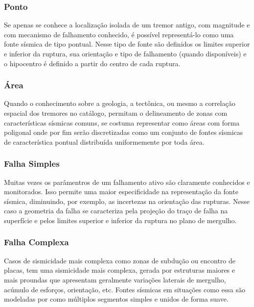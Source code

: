\subsubsection{Ponto}
\label{sec:point_source}

Se apenas se conhece a localização isolada de um tremor antigo, com magnitude e com mecanismo de falhamento conhecido,
é possível representá-lo como uma fonte sísmica de tipo pontual. Nesse tipo de fonte são definidos os limites superior e
inferior da ruptura, sua orientação e tipo de falhamento (quando disponíveis) e o hipocentro é definido a partir do
centro de cada ruptura.

\subsubsection{Área}
\label{sec:area_source}

Quando o conhecimento sobre a geologia, a tectônica, ou mesmo a correlação espacial dos tremores no catálogo, permitam
o delineamento de zonas com características sísmicas comuns, se costuma representar como áreas com forma poligonal onde
por fim serão discretizadas como um conjunto de fontes sísmicas de característica pontual distribuída uniformemente por
toda área.

\subsubsection{Falha Simples}
\label{sec:simple_fault_source}

Muitas vezes os parâmentros de um falhamento ativo são claramente conhecidos e monitorados. Isso permite uma maior
especificidade na representação da fonte sísmica, diminuindo, por exemplo, as incertezas na orientação das rupturas.
Nesse caso a geometria da falha se caracteriza pela projeção do traço de falha na superfície e pelos limites superior e
inferior da ruptura no plano de mergulho.


\subsubsection{Falha Complexa}
\label{sec:complex_fault_source}

Casos de sismicidade mais complexa como zonas de subdução ou encontro de placas, tem uma sismicidade mais complexa,
gerada por estruturas maiores e mais proundas que apresentam geralmente variações laterais de mergulho, acúmulo de
esforços, orientação, etc. Fontes sísmicas em situações como essa são modeladas por como múltiplos segmentos simples e
unidos de forma suave.


